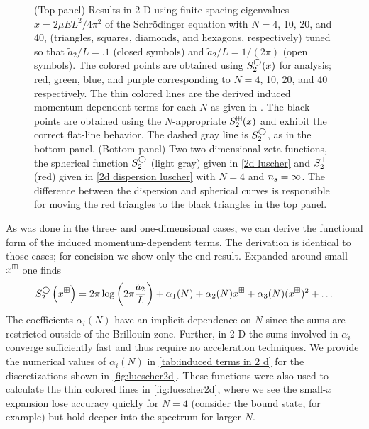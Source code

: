\begin{figure}
    \center
    
    \caption{
        (Top panel)
        Results in 2-D using finite-spacing eigenvalues $x=2\mu EL^2/4\pi^2$ of the Schr\"odinger equation with $N=4$, 10, 20, and 40, (triangles, squares, diamonds, and hexagons, respectively) tuned so that $\tilde a_{2}/L=.1$ (closed symbols) and $\tilde a_{2}/L=1/(2\pi)$ (open symbols).
        The colored points are obtained using $S^\bigcirc_2(x)$ for analysis; red, green, blue, and purple corresponding to $N=4$, 10, 20, and 40 respectively.
        The thin colored lines are the derived induced momentum-dependent terms for each $N$ as given in .
        The black points are obtained using the $N$-appropriate $S^{\boxplus}_2(x)$ and exhibit the correct flat-line behavior.
        The dashed gray line is $S_2^\bigcirc$, as in the bottom panel.
        (Bottom panel)
        Two two-dimensional zeta functions, the spherical function $S_2^{\bigcirc}$ (light gray) given in \eqref{2d luscher} and $S_2^{\boxplus}$ (red) given in \eqref{2d dispersion luscher} with $N=4$ and ${n_s}=\infty$.
        The difference between the dispersion and spherical curves is responsible for moving the red triangles to the black triangles in the top panel.
        }
    \label{fig:luescher2d}
\end{figure}

As was done in the three- and one-dimensional cases, we can derive the functional form of the induced momentum-dependent terms.
The derivation is identical to those cases; for concision we show only the end result.
Expanded around small $x^\boxplus$ one finds
\begin{equation}
    \label{eq:2D corrections}
    S^\bigcirc_{2}\left(x^\boxplus\right)
    =
    2\pi\log\left(2\pi \frac{\tilde a_{2}}{L}\right)
    + \alpha_1(N)
    + \alpha_2(N) x^\boxplus
    + \alpha_3(N) (x^\boxplus)^2
    + \ldots
\end{equation}
The coefficients $\alpha_i(N)$ have an implicit dependence on $N$ since the sums are restricted outside of the Brillouin zone.  Further, in 2-D the sums involved in $\alpha_i$ converge sufficiently fast and thus require no acceleration techniques.
We provide the numerical values of $\alpha_i(N)$ in \autoref{tab:induced terms in 2 d} for the discretizations shown in \autoref{fig:luescher2d}.
These functions were also used to calculate the thin colored lines in \autoref{fig:luescher2d}, where we see the small-$x$ expansion lose accuracy quickly for $N=4$ (consider the bound state, for example) but hold deeper into the spectrum for larger $N$.

